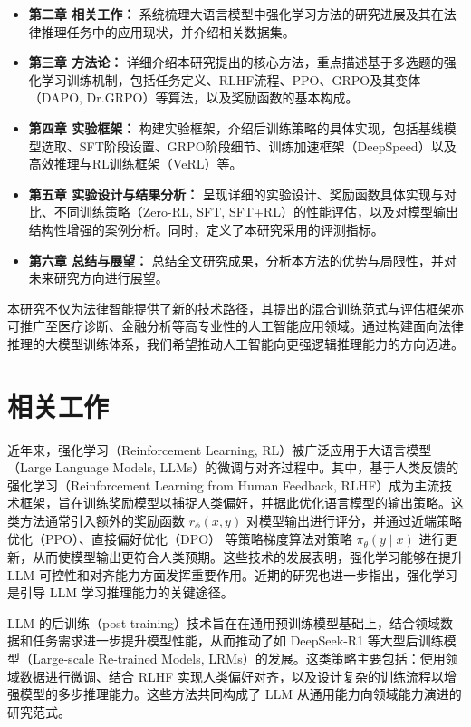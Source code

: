 \documentclass{pkuthesis}
\begin{document}
\begin{itemize}
    \item \textbf{第二章 相关工作：} 系统梳理大语言模型中强化学习方法的研究进展及其在法律推理任务中的应用现状，并介绍相关数据集。
    \item \textbf{第三章 方法论：} 详细介绍本研究提出的核心方法，重点描述基于多选题的强化学习训练机制，包括任务定义、RLHF流程、PPO、GRPO及其变体（DAPO, Dr.GRPO）等算法，以及奖励函数的基本构成。
    \item \textbf{第四章 实验框架：} 构建实验框架，介绍后训练策略的具体实现，包括基线模型选取、SFT阶段设置、GRPO阶段细节、训练加速框架（DeepSpeed）以及高效推理与RL训练框架（VeRL）等。
    \item \textbf{第五章 实验设计与结果分析：} 呈现详细的实验设计、奖励函数具体实现与对比、不同训练策略（Zero-RL, SFT, SFT+RL）的性能评估，以及对模型输出结构性增强的案例分析。同时，定义了本研究采用的评测指标。
    \item \textbf{第六章 总结与展望：} 总结全文研究成果，分析本方法的优势与局限性，并对未来研究方向进行展望。
\end{itemize}

本研究不仅为法律智能提供了新的技术路径，其提出的混合训练范式与评估框架亦可推广至医疗诊断、金融分析等高专业性的人工智能应用领域。通过构建面向法律推理的大模型训练体系，我们希望推动人工智能向更强逻辑推理能力的方向迈进。

\section{相关工作}


近年来，强化学习（Reinforcement Learning, RL）被广泛应用于大语言模型（Large Language Models, LLMs）的微调与对齐过程中。其中，基于人类反馈的强化学习（Reinforcement Learning from Human Feedback, RLHF）成为主流技术框架，旨在训练奖励模型以捕捉人类偏好，并据此优化语言模型的输出策略。这类方法通常引入额外的奖励函数 $r_{\phi}(x, y)$ 对模型输出进行评分，并通过近端策略优化（PPO）\cite{schulman2017proximal}、直接偏好优化（DPO）\cite{rafailov2023direct} 等策略梯度算法对策略 $\pi_{\theta}(y \mid x)$ 进行更新，从而使模型输出更符合人类预期。这些技术的发展表明，强化学习能够在提升 LLM 可控性和对齐能力方面发挥重要作用。近期的研究也进一步指出，强化学习是引导 LLM 学习推理能力的关键途径。

LLM 的后训练（post-training）技术旨在在通用预训练模型基础上，结合领域数据和任务需求进一步提升模型性能，从而推动了如 DeepSeek-R1\cite{guo2025deepseek} 等大型后训练模型（Large-scale Re-trained Models, LRMs）的发展。这类策略主要包括：使用领域数据进行微调、结合 RLHF 实现人类偏好对齐，以及设计复杂的训练流程以增强模型的多步推理能力。这些方法共同构成了 LLM 从通用能力向领域能力演进的研究范式。
\end{document}
